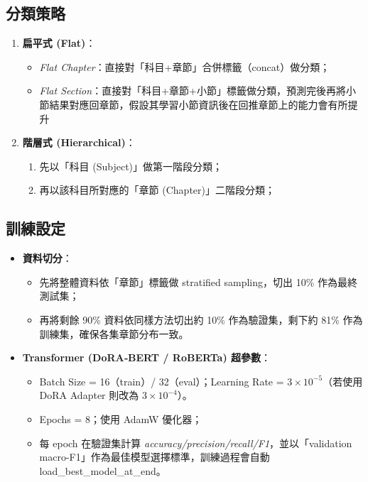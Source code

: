 \documentclass[10pt]{article}
\begin{document}
\begin{CJK}{UTF8}{bsmi}
\subsection{分類策略}
\begin{enumerate}[label=(\arabic*)]
  \item \textbf{扁平式 (Flat)}：  
    \begin{itemize}
      \item \emph{Flat Chapter}：直接對「科目+章節」合併標籤（concat）做分類；  
      \item \emph{Flat Section}：直接對「科目+章節+小節」標籤做分類，預測完後再將小節結果對應回章節，假設其學習小節資訊後在回推章節上的能力會有所提升
    \end{itemize}

  \item \textbf{階層式 (Hierarchical)}：  
    \begin{enumerate}[label=(\alph*)]
      \item 先以「科目 (Subject)」做第一階段分類；  
      \item 再以該科目所對應的「章節 (Chapter)」二階段分類；  
    \end{enumerate}
\end{enumerate}

\subsection{訓練設定}
\begin{itemize}
  \item \textbf{資料切分}：  
    \begin{itemize}
      \item 先將整體資料依「章節」標籤做 stratified sampling，切出 10\% 作為最終測試集；  
      \item 再將剩餘 90\% 資料依同樣方法切出約 10\% 作為驗證集，剩下約 81\% 作為訓練集，確保各集章節分布一致。  
    \end{itemize}

  \item \textbf{Transformer (DoRA‐BERT / RoBERTa) 超參數}：
    \begin{itemize}
      \item Batch Size = 16（train）/ 32（eval）；Learning Rate = $3\times10^{-5}$（若使用 DoRA Adapter 則改為 $3\times10^{-4}$）。  
      \item Epochs = 8；使用 AdamW 優化器；  
      \item 每 epoch 在驗證集計算 \textit{accuracy/precision/recall/F1}，並以「validation macro-F1」作為最佳模型選擇標準，訓練過程會自動 load\_best\_model\_at\_end。  
    \end{itemize}


\end{itemize}
\end{CJK}
\end{document}
